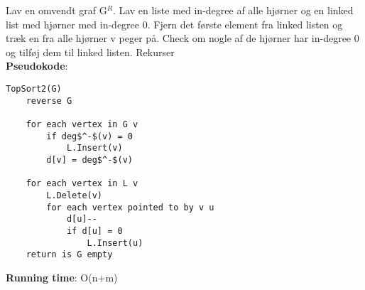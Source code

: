 Lav en omvendt graf G$^R$. Lav en liste med in-degree af alle hjørner og en linked list med hjørner med in-degree 0. Fjern det første element fra linked listen og træk en fra alle hjørner v peger på. Check om nogle af de hjørner har in-degree 0 og tilføj dem til linked listen. Rekurser\\
\textbf{Pseudokode}:
\begin{lstlisting}[frame=single, mathescape=true]
TopSort2(G)
	reverse G

	for each vertex in G v
		if deg$^-$(v) = 0
			L.Insert(v)
		d[v] = deg$^-$(v)

	for each vertex in L v
		L.Delete(v)
		for each vertex pointed to by v u
			d[u]--
			if d[u] = 0
				L.Insert(u)
	return is G empty
\end{lstlisting}
\textbf{Running time}: O(n+m)